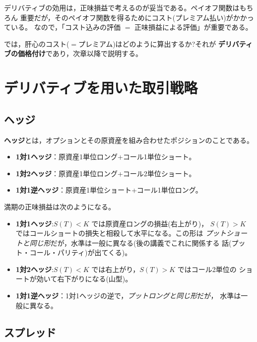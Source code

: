 \begin{keypoint}[正味損益の重要性]
デリバティブの効用は，正味損益で考えるのが妥当である。ペイオフ関数はもちろん
重要だが，そのペイオフ関数を得るためにコスト(プレミアム払い)がかかっている。
なので，「コスト込みの評価 $=$ 正味損益による評価」が重要である。

では，肝心のコスト($=$プレミアム)はどのように算出するか?それが
\textbf{デリバティブの価格付け}であり，次章以降で説明する。
\end{keypoint}

\section{デリバティブを用いた取引戦略}

\subsection{ヘッジ}

\begin{definition}[ヘッジ]
\textbf{ヘッジ}とは，オプションとその原資産を組み合わせたポジションのことである。
\begin{itemize}
\item \textbf{1対1ヘッジ}：原資産1単位ロング+コール1単位ショート。
\item \textbf{1対2ヘッジ}：原資産1単位ロング+コール2単位ショート。
\item \textbf{1対1逆ヘッジ}：原資産1単位ショート+コール1単位ロング。
\end{itemize}
\end{definition}

満期の正味損益は次のようになる。
\begin{itemize}
\item \textbf{1対1ヘッジ}:$S(T)<K$ では原資産ロングの損益(右上がり)，
$S(T)>K$ ではコールショートの損失と相殺して水平になる。この形は
\emph{プットショートと同じ形}だが，水準は一般に異なる(後の講義でこれに関係する
話(プット・コール・パリティ)が出てくる)。
\item \textbf{1対2ヘッジ}:$S(T)<K$ では右上がり，$S(T)>K$ ではコール2単位の
ショートが効いて右下がりになる(山型)。
\item \textbf{1対1逆ヘッジ}：1対1ヘッジの逆で，\emph{プットロングと同じ形}だが，
水準は一般に異なる。
\end{itemize}

\subsection{スプレッド}

